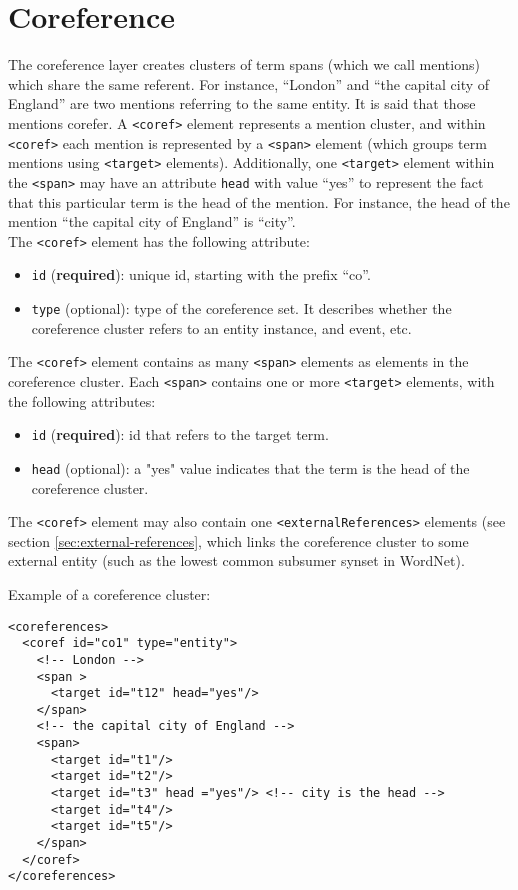 
\section{Coreference}
\label{sec:coreference}

The coreference layer creates clusters of term spans (which we call
mentions) which share the same referent. For instance, ``London'' and ``the
capital city of England'' are two mentions referring to the same entity. It
is said that those mentions corefer.  A \texttt{<coref>} element represents
a mention cluster, and within \texttt{<coref>} each mention is represented
by a \texttt{<span>} element (which groups term mentions using
\texttt{<target>} elements). Additionally, one \texttt{<target>} element
within the \texttt{<span>} may have an attribute \texttt{head} with value
``yes'' to represent the fact that this particular term is the head of the
mention. For instance, the head of the mention ``the capital city of
England'' is ``city''.\\

The \texttt{<coref>} element has the following attribute:
\begin{itemize}
\item \texttt{id} (\textbf{required}): unique id, starting with the prefix ``co''.
\item \texttt{type} (optional): type of the coreference set. It describes
  whether the coreference cluster refers to an entity instance, and event,
  etc.
\end{itemize}

The \texttt{<coref>} element contains as many \texttt{<span>} elements as
elements in the coreference cluster. Each \texttt{<span>} contains one or
more \texttt{<target>} elements, with the following attributes:
\begin{itemize}
\item \texttt{id} (\textbf{required}): id that refers to the target term.
\item \texttt{head} (optional): a "yes" value indicates that the term is the
  head of the coreference cluster.
\end{itemize}

The \texttt{<coref>} element may also contain one
\texttt{<externalReferences>} elements (see section
\ref{sec:external-references}, which links the coreference cluster to some
external entity (such as the lowest common subsumer synset in WordNet).

Example of a coreference cluster:

\begin{Verbatim}[fontsize=\small]
<coreferences>
  <coref id="co1" type="entity">
    <!-- London -->
    <span >
      <target id="t12" head="yes"/>
    </span>
    <!-- the capital city of England -->
    <span>
      <target id="t1"/>
      <target id="t2"/>
      <target id="t3" head ="yes"/> <!-- city is the head -->
      <target id="t4"/>
      <target id="t5"/>
    </span>
  </coref>
</coreferences>
\end{Verbatim}


